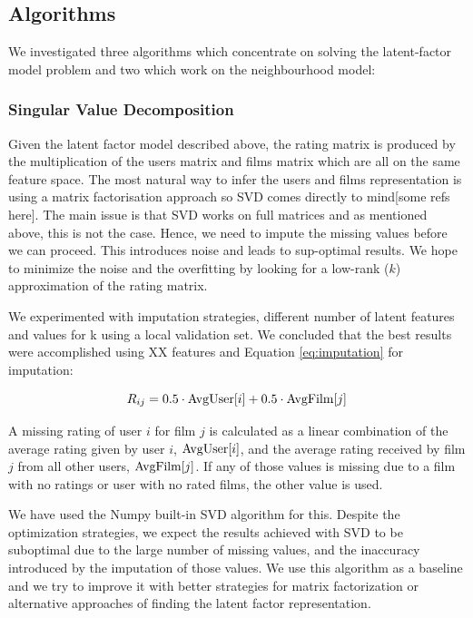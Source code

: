 \documentclass[10pt,conference,compsocconf]{IEEEtran}
\begin{document}
\subsection{Algorithms}
We investigated three algorithms which concentrate on solving the latent-factor model problem and two which work on the neighbourhood model:

\subsubsection*{\textbf{Singular Value Decomposition}} Given the latent factor model described above, the rating matrix is produced by the multiplication of the users matrix and films matrix which are all on the same feature space. The most natural way to infer the users and films representation is using a matrix factorisation approach so SVD comes directly to mind[some refs here]. The main issue is that SVD works on full matrices and as mentioned above, this is not the case. Hence, we need to impute the missing values before we can proceed. This introduces noise and leads to sup-optimal results. We hope to minimize the noise and the overfitting by looking for a low-rank ($k$) approximation of the rating matrix. 

We experimented with imputation strategies, different number of latent features and values for k using a local validation set. We concluded that the best results were accomplished using XX features and Equation \ref{eq:imputation} for imputation:

\begin{equation}
R_{ij}= 0.5\cdot \textnormal{AvgUser}[i] + 0.5\cdot \textnormal{AvgFilm}[j]
\label{eq:imputation}
\end{equation}

A missing rating of user $i$ for film $j$ is calculated as a linear combination of the average rating given by user $i$, $\textnormal{AvgUser}[i]$, and the average rating received by film $j$ from all other users, $\textnormal{AvgFilm}[j]$. If any of those values is missing due to a film with no ratings or user with no rated films, the other value is used.

We have used the Numpy built-in SVD algorithm for this. Despite the optimization strategies, we expect the results achieved with SVD to be suboptimal due to the large number of missing values, and the inaccuracy introduced by the imputation of those values. We use this algorithm as a baseline and we try to improve it with better strategies for matrix factorization or alternative approaches of finding the latent factor representation.
\end{document}

